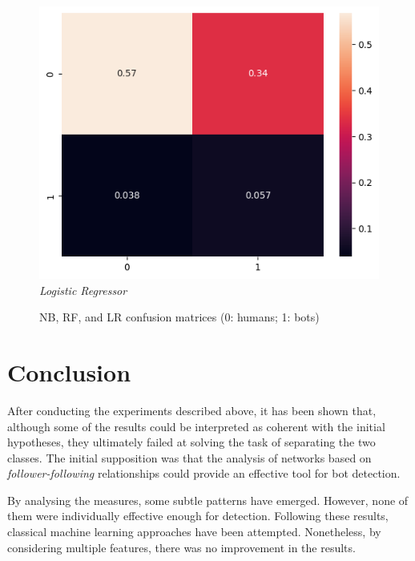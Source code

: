 \documentclass[12pt, a4paper]{article}
\begin{document}
\begin{figure}[H]
\begin{minipage}[b]{0.46\textwidth}
    		\end{minipage}
    		\hfill
    		\begin{minipage}[b]{0.46\textwidth}    				
        		\centering
        		\includegraphics[width=\textwidth]{classification/complete_lr_confusion.png}
        		\textit{\small Logistic Regressor}
    		\end{minipage}
    		\caption{NB, RF, and LR confusion matrices (0: humans; 1: bots)}
		\end{figure}
		

\section{Conclusion} \label{conclusion}
	After conducting the experiments described above, it has been shown that, although some of the results could be interpreted as coherent with the initial hypotheses, they ultimately failed at solving the task of separating the two classes. The initial supposition was that the analysis of networks based on \textit{follower-following} relationships could provide an effective tool for bot detection.
	\vspace{0.2cm}
	
	By analysing the measures, some subtle patterns have emerged. However, none of them were individually effective enough for detection.
	Following these results, classical machine learning approaches have been attempted. Nonetheless, by considering multiple features, there was no improvement in the results.	
\end{document}
